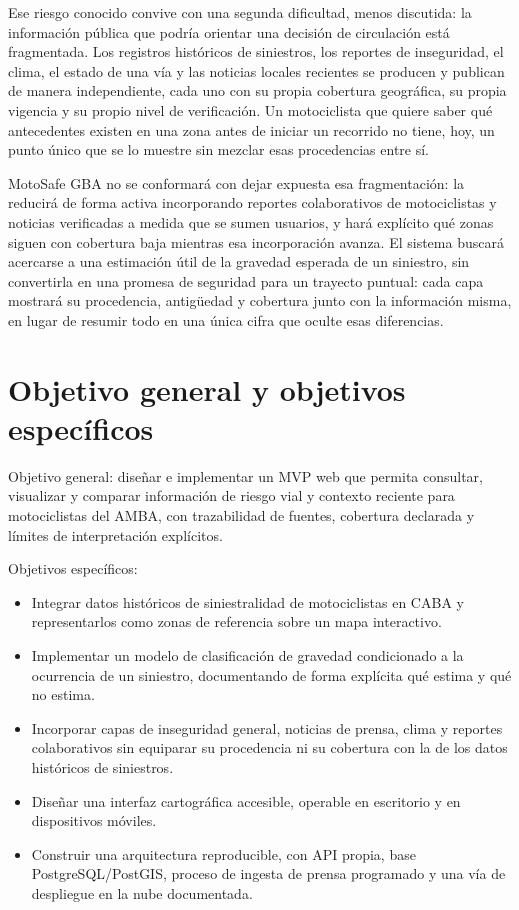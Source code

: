 Ese riesgo conocido convive con una segunda dificultad, menos discutida:
la información pública que podría orientar una decisión de circulación
está fragmentada. Los registros históricos de siniestros, los reportes
de inseguridad, el clima, el estado de una vía y las noticias locales
recientes se producen y publican de manera independiente, cada uno con
su propia cobertura geográfica, su propia vigencia y su propio nivel de
verificación. Un motociclista que quiere saber qué antecedentes existen
en una zona antes de iniciar un recorrido no tiene, hoy, un punto único
que se lo muestre sin mezclar esas procedencias entre sí.

MotoSafe GBA no se conformará con dejar expuesta esa fragmentación: la
reducirá de forma activa incorporando reportes colaborativos de
motociclistas y noticias verificadas a medida que se sumen usuarios, y
hará explícito qué zonas siguen con cobertura baja mientras esa
incorporación avanza. El sistema buscará acercarse a una estimación útil
de la gravedad esperada de un siniestro, sin convertirla en una promesa
de seguridad para un trayecto puntual: cada capa mostrará su
procedencia, antigüedad y cobertura junto con la información misma, en
lugar de resumir todo en una única cifra que oculte esas diferencias.

\section{Objetivo general y objetivos específicos}

Objetivo general: diseñar e implementar un MVP web que permita
consultar, visualizar y comparar información de riesgo vial y contexto
reciente para motociclistas del AMBA, con trazabilidad de fuentes,
cobertura declarada y límites de interpretación explícitos.

Objetivos específicos:

\begin{itemize}
\item
  Integrar datos históricos de siniestralidad de motociclistas en CABA y
  representarlos como zonas de referencia sobre un mapa interactivo.
\item
  Implementar un modelo de clasificación de gravedad condicionado a la
  ocurrencia de un siniestro, documentando de forma explícita qué estima
  y qué no estima.
\item
  Incorporar capas de inseguridad general, noticias de prensa, clima y
  reportes colaborativos sin equiparar su procedencia ni su cobertura
  con la de los datos históricos de siniestros.
\item
  Diseñar una interfaz cartográfica accesible, operable en escritorio y
  en dispositivos móviles.
\item
  Construir una arquitectura reproducible, con API propia, base
  PostgreSQL/PostGIS, proceso de ingesta de prensa programado y una vía
  de despliegue en la nube documentada.
\end{itemize}

